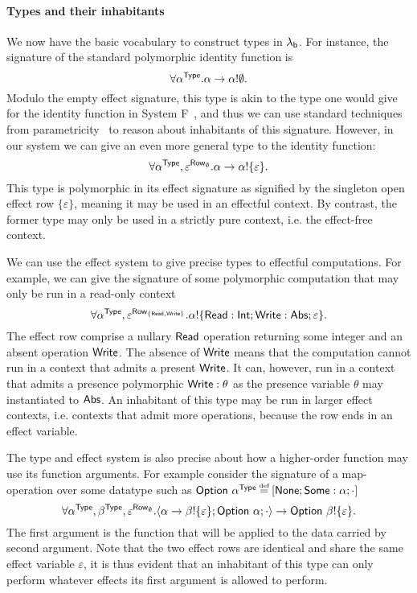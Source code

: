 \documentclass[12pt,phd,lfcs,twoside,openright,logo,leftchapter,normalheadings]{infthesis}
\theoremstyle{plain}
\theoremstyle{definition}
\begin{document}
\paragraph{Types and their inhabitants}
We now have the basic vocabulary to construct types in $\lambda_{\mathsf{b}}$. For
instance, the signature of the standard polymorphic identity function
is
%
\[
  \forall \alpha^{\mathsf{Type}}. \alpha \to \alpha ! \emptyset.
\]
%
Modulo the empty effect signature, this type is akin to the type one
would give for the identity function in System
F~\cite{Girard72,Reynolds74}, and thus we can use standard techniques
from parametricity~\cite{Wadler89} to reason about inhabitants of this
signature. However, in our system we can give an even more general
type to the identity function:
%
\[
  \forall \alpha^{\mathsf{Type}},\varepsilon^{\mathsf{Row}_\emptyset}. \alpha \to \alpha ! \{\varepsilon\}.
\]
%
This type is polymorphic in its effect signature as signified by the
singleton open effect row $\{\varepsilon\}$, meaning it may be used in
an effectful context. By contrast, the former type may only be used in
a strictly pure context, i.e. the effect-free context.
%
%

We can use the effect system to give precise types to effectful
computations. For example, we can give the signature of some
polymorphic computation that may only be run in a read-only context
%
\[
  \forall \alpha^{\mathsf{Type}}, \varepsilon^{\mathsf{Row}_{\{\mathsf{Read},\mathsf{Write}\}}}. \alpha ! \{\mathsf{Read}:\mathsf{Int};\mathsf{Write}:\mathsf{Abs};\varepsilon\}.
\]
%
The effect row comprise a nullary $\mathsf{Read}$ operation returning some
integer and an absent operation $\mathsf{Write}$. The absence of $\mathsf{Write}$
means that the computation cannot run in a context that admits a
present $\mathsf{Write}$.  It can, however, run in a context that admits a
presence polymorphic $\mathsf{Write} : \theta$ as the presence variable
$\theta$ may instantiated to $\mathsf{Abs}$. An inhabitant of this type may be
run in larger effect contexts, i.e. contexts that admit more
operations, because the row ends in an effect variable.
%

The type and effect system is also precise about how a higher-order
function may use its function arguments. For example consider the
signature of a map-operation over some datatype such as
$\Option~\alpha^\Type \defas [\None;\Some:\alpha;\cdot]$
%
\[
  \forall \alpha^{\mathsf{Type}},\beta^{\mathsf{Type}},\varepsilon^{\mathsf{Row}_\emptyset}. \langle \alpha \to \beta ! \{\varepsilon\}; \mathsf{Option}~\alpha;\cdot \rangle \to \mathsf{Option}~\beta ! \{\varepsilon\}.
\]
%
%
The first argument is the function that will be applied to the data
carried by second argument. Note that the two effect rows are
identical and share the same effect variable $\varepsilon$, it is thus
evident that an inhabitant of this type can only perform whatever
effects its first argument is allowed to perform.
\end{document}
